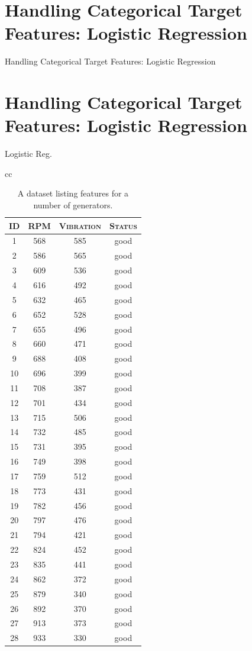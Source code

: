 \documentclass[xcolor={table}]{beamer}
\newcommand{\SectionSlideShortHeader}[3][]{
	\ifthenelse{\isempty{#1}}
		{\section[#3]{#2}\begin{frame} \begin{center}\begin{huge}#2\end{huge}\end{center}\end{frame}}
		{\section[#1]{#2}\begin{frame} \begin{center}\begin{huge}#3\end{huge}\end{center}\end{frame}}
}
\newcommand{\featN}[1]{\textsc{#1}}
\begin{document}
\SectionSlideShortHeader{Handling Categorical Target Features: Logistic Regression}{Logistic Reg.}

 \begin{frame} [plain]
\begin{table}[!bht]
	\caption{A dataset listing features for a number of generators.}
\label{tab:faultyMachineryData}
\centering
\begin{tiny}
\begin{tabular}{cc}
		\hline
			\begin{minipage}{0.48\textwidth}
					\begin{tabular}[ht]{ c c c c }
\featN{ID} & \featN{RPM} & \featN{Vibration} & \featN{Status} \\
		\hline
1	&	568	&	585	&	good	\\
2	&	586	&	565	&	good		\\
3	&	609	&	536	&	good		\\
4	&	616	&	492	&	good		\\
5	&	632	&	465	&	good		\\
6	&	652	&	528	&	good		\\
7	&	655	&	496	&	good		\\
8	&	660	&	471	&	good		\\
9	&	688	&	408	&	good		\\
10	&	696	&	399	&	good		\\
11	&	708	&	387	&	good		\\
12	&	701	&	434	&	good		\\
13	&	715	&	506	&	good		\\
14	&	732	&	485	&	good		\\
15	&	731	&	395	&	good		\\
16	&	749	&	398	&	good		\\
17	&	759	&	512	&	good		\\
18	&	773	&	431	&	good		\\
19	&	782	&	456	&	good		\\
20	&	797	&	476	&	good		\\
21	&	794	&	421	&	good		\\
22	&	824	&	452	&	good		\\
23	&	835	&	441	&	good		\\
24	&	862	&	372	&	good		\\
25	&	879	&	340	&	good		\\
26	&	892	&	370	&	good		\\
27	&	913	&	373	&	good		\\
28	&	933	&	330	&	good	\\
		\hline

\end{tabular}
\end{minipage}
\end{tabular}
\end{tiny}
\end{table}
\end{frame}
\end{document}
